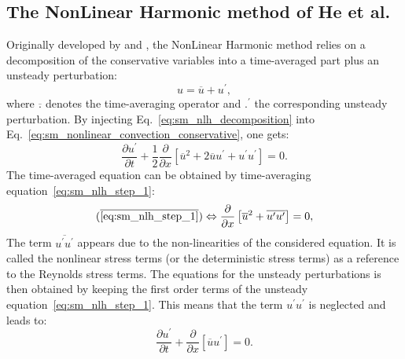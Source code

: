 
\subsection{The NonLinear Harmonic method of He et al.} %
\label{sub:sm_nonlinear_harmonic_method}

Originally developed by \citet{He1998} and \citet{Ning1998},
the 
NonLinear Harmonic method
relies on a decomposition of the conservative variables into a
time-averaged part plus an unsteady perturbation:
\begin{equation}
	u = \overline{u} + u^\prime,
	\label{eq:sm_nlh_decomposition}
\end{equation}
where $\overline{.}$ denotes the time-averaging operator and
$.^\prime$ the corresponding unsteady perturbation.
By injecting Eq.~\ref{eq:sm_nlh_decomposition} into
Eq.~\ref{eq:sm_nonlinear_convection_conservative}, one gets:
\begin{equation}
	\frac{\partial u^\prime}{\partial t} + 
	\frac{1}{2}\frac{\partial}{\partial x} \left[
	\overline{u}^2 + 2 \overline{u} u^\prime + u^\prime u^\prime \right] = 
	0.
	\label{eq:sm_nlh_step_1}
\end{equation}
The time-averaged equation can be obtained by time-averaging
equation~\ref{eq:sm_nlh_step_1}:
\begin{equation}
	(\overline{\ref{eq:sm_nlh_step_1}})
	\Leftrightarrow
	\frac{\partial}{\partial x}
	\left[\overline{u}^2 + 
	\overline{u^\prime u^\prime}\right] =
	0,
	\label{eq:sm_nlh_step_2}
\end{equation}
The term $\overline{u^\prime u^\prime}$
appears due to the non-linearities of the considered equation. It
is called the nonlinear stress terms 
(or the deterministic stress terms) as a reference to 
the Reynolds stress terms. 
The equations for the unsteady perturbations is then obtained by keeping
the first order terms of the unsteady equation~\ref{eq:sm_nlh_step_1}.
This means that the term $u^\prime u^\prime$ is neglected and leads
to:
\begin{equation}
	\frac{\partial u^\prime}{\partial t} + 
	\frac{\partial}{\partial x} \left[\overline{u} u^\prime \right] = 
	0.
\end{equation}

